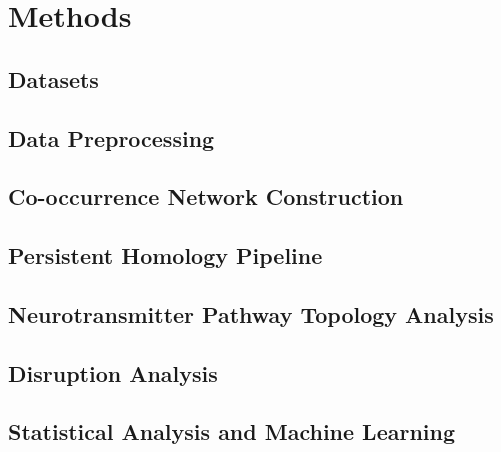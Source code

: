 \section{Methods}
\label{sec:methods}


\subsection{Datasets}
\label{subsec:datasets}

\subsection{Data Preprocessing}
\label{subsec:preprocessing}

\subsection{Co-occurrence Network Construction}
\label{subsec:network_construction}

\subsection{Persistent Homology Pipeline}
\label{subsec:ph_pipeline}

\subsection{Neurotransmitter Pathway Topology Analysis}
\label{subsec:nt_topology}

\subsection{Disruption Analysis}
\label{subsec:disruption_analysis}

\subsection{Statistical Analysis and Machine Learning}
\label{subsec:statistics}
